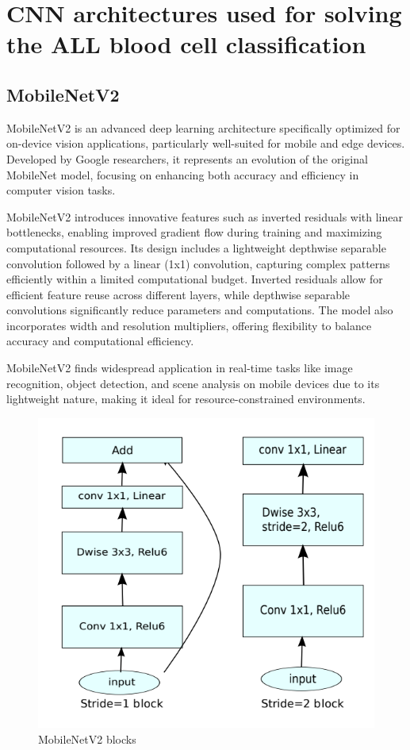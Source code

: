 \documentclass[runningheads,a4paper,11pt]{report}
\begin{document}
\section{CNN architectures used for solving the ALL blood cell classification}
\subsection{MobileNetV2}

MobileNetV2 is an advanced deep learning architecture specifically optimized for on-device vision applications, particularly well-suited for mobile and edge devices. Developed by Google researchers, it represents an evolution of the original MobileNet model, focusing on enhancing both accuracy and efficiency in computer vision tasks.

MobileNetV2 introduces innovative features such as inverted residuals with linear bottlenecks, enabling improved gradient flow during training and maximizing computational resources. Its design includes a lightweight depthwise separable convolution followed by a linear (1x1) convolution, capturing complex patterns efficiently within a limited computational budget. Inverted residuals allow for efficient feature reuse across different layers, while depthwise separable convolutions significantly reduce parameters and computations. The model also incorporates width and resolution multipliers, offering flexibility to balance accuracy and computational efficiency. 

MobileNetV2 finds widespread application in real-time tasks like image recognition, object detection, and scene analysis on mobile devices due to its lightweight nature, making it ideal for resource-constrained environments.
\begin{figure}[h]
    \centering
    \includegraphics[scale=0.5]{images/mobilenetv2.png} 
    \caption{MobileNetV2 blocks }
\end{figure}
\end{document}
